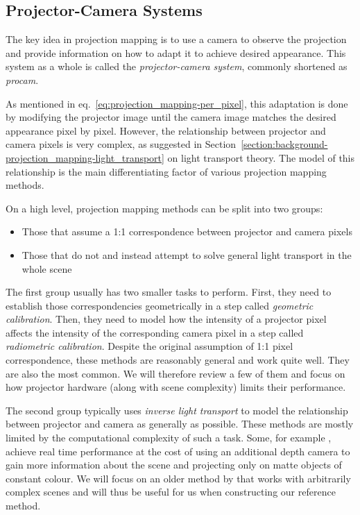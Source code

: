 \subsection{Projector-Camera Systems}
\label{section:background-projection_mapping-procams}

The key idea in projection mapping is to use a camera to observe the projection and provide information on how to adapt it to achieve desired appearance. This system as a whole is called the \textit{projector-camera system}, commonly shortened as \textit{procam}.

As mentioned in eq.~\ref{eq:projection_mapping-per_pixel}, this adaptation is done by modifying the projector image until the camera image matches the desired appearance pixel by pixel. However, the relationship between projector and camera pixels is very complex, as suggested in Section~\ref{section:background-projection_mapping-light_transport} on light transport theory. The model of this relationship is the main differentiating factor of various projection mapping methods.

On a high level, projection mapping methods can be split into two groups:

\begin{itemize}
    \item Those that assume a 1:1 correspondence between projector and camera pixels
    \item Those that do not and instead attempt to solve general light transport in the whole scene
\end{itemize}

The first group usually has two smaller tasks to perform. First, they need to establish those correspondencies geometrically in a step called \textit{geometric calibration}. Then, they need to model how the intensity of a projector pixel affects the intensity of the corresponding camera pixel in a step called \textit{radiometric calibration}. Despite the original assumption of 1:1 pixel correspondence, these methods are reasonably general and work quite well. They are also the most common. We will therefore review a few of them and focus on how projector hardware (along with scene complexity) limits their performance.

The second group typically uses \textit{inverse light transport} to model the relationship between projector and camera as generally as possible. These methods are mostly limited by the computational complexity of such a task. Some, for example \citet{Siegl2017}, achieve real time performance at the cost of using an additional depth camera to gain more information about the scene and projecting only on matte objects of constant colour. We will focus on an older method by \citet{Wetzstein2007} that works with arbitrarily complex scenes and will thus be useful for us when constructing our reference method.

